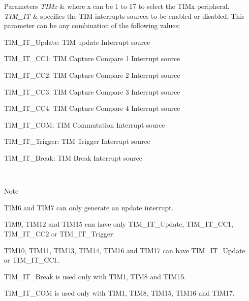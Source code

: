 \begin{DoxyParams}{Parameters}
{\em T\+I\+Mx} & where x can be 1 to 17 to select the T\+I\+Mx peripheral. \\
\hline
{\em T\+I\+M\+\_\+\+IT} & specifies the T\+IM interrupts sources to be enabled or disabled. This parameter can be any combination of the following values\+: \begin{DoxyItemize}
\item T\+I\+M\+\_\+\+I\+T\+\_\+\+Update\+: T\+IM update Interrupt source \item T\+I\+M\+\_\+\+I\+T\+\_\+\+C\+C1\+: T\+IM Capture Compare 1 Interrupt source \item T\+I\+M\+\_\+\+I\+T\+\_\+\+C\+C2\+: T\+IM Capture Compare 2 Interrupt source \item T\+I\+M\+\_\+\+I\+T\+\_\+\+C\+C3\+: T\+IM Capture Compare 3 Interrupt source \item T\+I\+M\+\_\+\+I\+T\+\_\+\+C\+C4\+: T\+IM Capture Compare 4 Interrupt source \item T\+I\+M\+\_\+\+I\+T\+\_\+\+C\+OM\+: T\+IM Commutation Interrupt source \item T\+I\+M\+\_\+\+I\+T\+\_\+\+Trigger\+: T\+IM Trigger Interrupt source \item T\+I\+M\+\_\+\+I\+T\+\_\+\+Break\+: T\+IM Break Interrupt source \end{DoxyItemize}
\\
\hline
\end{DoxyParams}
\begin{DoxyNote}{Note}

\begin{DoxyItemize}
\item T\+I\+M6 and T\+I\+M7 can only generate an update interrupt.
\item T\+I\+M9, T\+I\+M12 and T\+I\+M15 can have only T\+I\+M\+\_\+\+I\+T\+\_\+\+Update, T\+I\+M\+\_\+\+I\+T\+\_\+\+C\+C1, T\+I\+M\+\_\+\+I\+T\+\_\+\+C\+C2 or T\+I\+M\+\_\+\+I\+T\+\_\+\+Trigger.
\item T\+I\+M10, T\+I\+M11, T\+I\+M13, T\+I\+M14, T\+I\+M16 and T\+I\+M17 can have T\+I\+M\+\_\+\+I\+T\+\_\+\+Update or T\+I\+M\+\_\+\+I\+T\+\_\+\+C\+C1.
\item T\+I\+M\+\_\+\+I\+T\+\_\+\+Break is used only with T\+I\+M1, T\+I\+M8 and T\+I\+M15.
\item T\+I\+M\+\_\+\+I\+T\+\_\+\+C\+OM is used only with T\+I\+M1, T\+I\+M8, T\+I\+M15, T\+I\+M16 and T\+I\+M17.
\end{DoxyItemize}
\end{DoxyNote}

